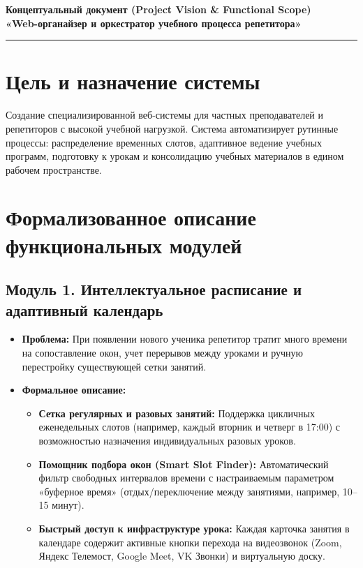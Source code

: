 \documentclass[12pt,a4paper]{article}
\begin{document}
\begin{center}
    {\normalsize\textbf{Концептуальный документ (Project Vision \& Functional Scope)}}\\[0.3em]
    {\Large\bfseries «Web-органайзер и оркестратор учебного процесса репетитора»}\\[0.6em]
    \rule{\textwidth}{0.6pt}
\end{center}

\vspace{0.2em}

\section{Цель и назначение системы}

Создание специализированной веб-системы для частных преподавателей и репетиторов с высокой учебной нагрузкой. Система автоматизирует рутинные процессы: распределение временных слотов, адаптивное ведение учебных программ, подготовку к урокам и консолидацию учебных материалов в едином рабочем пространстве.

\section{Формализованное описание функциональных модулей}

\subsection{Модуль 1. Интеллектуальное расписание и адаптивный календарь}

\begin{itemize}
    \item \textbf{Проблема:} При появлении нового ученика репетитор тратит много времени на сопоставление окон, учет перерывов между уроками и ручную перестройку существующей сетки занятий.
    \item \textbf{Формальное описание:}
    \begin{itemize}
        \item \textbf{Сетка регулярных и разовых занятий:} Поддержка цикличных еженедельных слотов (например, каждый вторник и четверг в 17:00) с возможностью назначения индивидуальных разовых уроков.
        \item \textbf{Помощник подбора окон (Smart Slot Finder):} Автоматический фильтр свободных интервалов времени с настраиваемым параметром «буферное время» (отдых/переключение между занятиями, например, 10--15 минут).
        \item \textbf{Быстрый доступ к инфраструктуре урока:} Каждая карточка занятия в календаре содержит активные кнопки перехода на видеозвонок (Zoom, Яндекс Телемост, Google Meet, VK Звонки) и виртуальную доску.
    \end{itemize}
\end{itemize}
\end{document}
